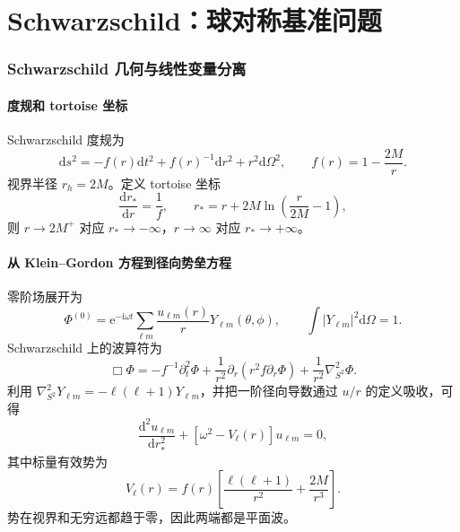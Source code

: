 \documentclass[UTF8,a4paper,11pt]{ctexart}
\newcommand{\dd}{\mathrm d}
\newcommand{\ii}{\mathrm i}
\newcommand{\ee}{\mathrm e}
\newcommand{\abs}[1]{\left|#1\right|}
\begin{document}
\part{Schwarzschild：球对称基准问题}

\section{Schwarzschild 几何与线性变量分离}
\label{sec:sch-linear}

\subsection{度规和 tortoise 坐标}

Schwarzschild 度规为
\begin{equation}
\dd s^2=-f(r)\dd t^2+f(r)^{-1}\dd r^2+r^2\dd\Omega^2,
\qquad f(r)=1-\frac{2M}{r}.
\end{equation}
视界半径 $r_h=2M$。定义 tortoise 坐标
\begin{equation}
\frac{\dd r_*}{\dd r}=\frac{1}{f},\qquad
r_*=r+2M\ln\left(\frac{r}{2M}-1\right),
\end{equation}
则 $r\to2M^+$ 对应 $r_*\to-\infty$，$r\to\infty$ 对应 $r_*\to+\infty$。

\subsection{从 Klein--Gordon 方程到径向势垒方程}

零阶场展开为
\begin{equation}
\Phi^{(0)}=\ee^{-\ii\omega t}
\sum_{\ell m}\frac{u_{\ell m}(r)}{r}Y_{\ell m}(\theta,\phi),
\qquad \int\abs{Y_{\ell m}}^2\dd\Omega=1.
\end{equation}
Schwarzschild 上的波算符为
\begin{equation}
\Box\Phi=-f^{-1}\partial_t^2\Phi
+\frac{1}{r^2}\partial_r(r^2f\partial_r\Phi)
+\frac{1}{r^2}\nabla_{S^2}^2\Phi.
\end{equation}
利用 $\nabla_{S^2}^2Y_{\ell m}=-\ell(\ell+1)Y_{\ell m}$，并把一阶径向导数通过 $u/r$ 的定义吸收，可得
\begin{equation}
\boxed{
\frac{\dd^2u_{\ell m}}{\dd r_*^2}
+\left[\omega^2-V_\ell(r)\right]u_{\ell m}=0,}
\label{eq:sch-rw}
\end{equation}
其中标量有效势为
\begin{equation}
V_\ell(r)=f(r)\left[
\frac{\ell(\ell+1)}{r^2}+\frac{2M}{r^3}
\right].
\label{eq:sch-pot}
\end{equation}
势在视界和无穷远都趋于零，因此两端都是平面波。
\end{document}
